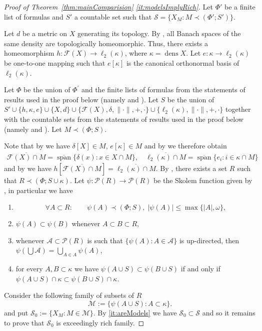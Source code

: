 \documentclass[11pt]{amsart}
\theoremstyle{definition}
\theoremstyle{remark}
\newcommand{\A}{\mathcal A}
\newcommand{\F}{\mathcal F}
\newcommand{\M}{\mathcal M}
\newcommand{\PP}{\mathcal P}
\newcommand{\SSS}{\mathcal S}
\newcommand{\closedSpan}{\overline{\operatorname{span}}}
\def \dens {\operatorname{dens}}
\begin{document}
\begin{proof}[Proof of Theorem~\ref{thm:mainComparision} \eqref{it:modelsImplyRich}]Let $\Phi'$ be a finite list of formulas and $S'$ a countable set such that $\SSS = \{X_M\colon M\prec(\Phi';S')\}$.

Let $d$ be a metric on $X$ generating its topology. By \cite{Tor81}, all Banach spaces of the same density are topologically homeomorphic. Thus, there exists a homeomorphism $h:\F(X)\to \ell_2(\kappa)$, where $\kappa = \dens X$. Let $e:\kappa \to \ell_2(\kappa)$ be one-to-one mapping such that $e[\kappa]$ is the canonical orthonormal basis of $\ell_2(\kappa)$.

Let $\Phi$ be the union of $\Phi^\prime$ and the finite lists of formulas from the statements of results used in the proof below (namely \cite[Lemma 7 and 8]{CCS0} and \cite[Lemma 12]{CCS}). Let $S$ be the union of $S'\cup\{h,\kappa,e\}\cup\{X,d\}\cup\{\F(X),\delta,\|\cdot\|,+,\cdot\}\cup\{\ell_2(\kappa),\|\cdot\|,+,\cdot\}$ together with the countable sets from the statements of results used in the proof below (namely \cite[Lemma 7 and 8]{CCS0} and \cite[Lemma 12]{CCS}). Let $M \prec (\Phi; S)$.

Note that by \cite[Lemma 7 and 8]{CCS0} we have $\delta[X]\in M$, $e[\kappa]\in M$ and by \cite[Lemma 12 (2)(ii)]{CCS} we therefore obtain 
\[\begin{split}
\overline{\F(X)\cap M} = \closedSpan\{\delta(x)\colon x\in X\cap M\},\quad \overline{\ell_2(\kappa)\cap M}= \closedSpan \{e_i\colon i\in\kappa\cap M\}
\end{split}\]
and by \cite[Lemma 12 (1)]{CCS} we have $h[\overline{\F(X)\cap M}] = \overline{\ell_2(\kappa)\cap M}$. By
\cite[Theorem IV.7.4]{kunenBook}, there exists a set $R$ such that $R \prec (\Phi; S\cup \kappa)$. Let $\psi: \PP(R) \to \PP(R)$ be the Skolem
function given by \cite[Lemma 13]{CCS}, in particular we have
\begin{enumerate}
    \item\label{it:areModels} \[\forall A\subset R:\qquad \psi(A)\prec (\Phi; S),\; |\psi(A)| \leq \max\{|A|,\omega\},\]
    \item $\psi(A)\subset \psi(B)$ whenever $A\subset B\subset R$,
    \item\label{it:upDirectedModelsSkolem} whenever $\A\subset \PP(R)$ is such that $\{\psi(A)\colon A\in\A\}$ is up-directed, then $\psi(\bigcup \A) = \bigcup_{A\in A} \psi(A)$,
    \item\label{it:subsetOnOrdinals} for every $A,B\subset \kappa$ we have $\psi(A\cup S)\subset \psi(B\cup S)$ if and only if $\psi(A\cup S)\cap \kappa\subset \psi(B\cup S)\cap \kappa$.
\end{enumerate}
Consider the following family of subsets of $R$
\begin{equation}\label{eq:defM}
\M := \{\psi(A\cup S)\colon A\subset \kappa\}.
\end{equation}
and put $\SSS_0:=\{X_M\colon M\in\M\}$. By \eqref{it:areModels} we have $\SSS_0\subset\SSS$ and so it remains to prove that $\SSS_0$ is exceedingly rich family.


\end{proof}
\end{document}
